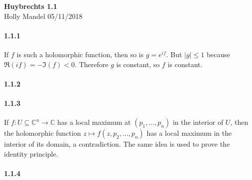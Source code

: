 \documentclass[10pt,letter]{article}
\begin{document}
\begin{center} 
{\bf Huybrechts 1.1} \\
Holly Mandel 05/11/2018
\end{center}

\paragraph*{1.1.1} If $f$ is such a holomorphic function, then so is $g = e^{if}$. But $\vert g \vert \leq 1$ because  $\Re(if) = - \Im(f)  < 0$. Therefore $g$ is constant, so $f$ is constant.  
\paragraph*{1.1.2} 
\paragraph*{1.1.3} If $f: U \subseteq \mathbb{C}^n \rightarrow \mathbb{C}$ has a local maximum at $(p_1,...,p_n)$ in the interior of $U$, then the holomorphic function $z \mapsto f(z,p_2,...,p_n)$ has a local maximum in the interior of its domain, a contradiction. The same idea is used to prove the identity principle.
\paragraph*{1.1.4} 
\end{document}
